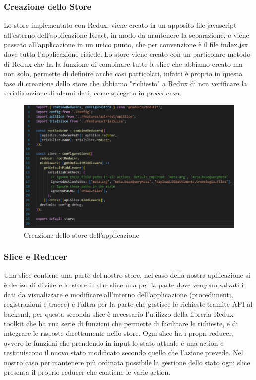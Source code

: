 \subsubsection{Creazione dello Store}
Lo store implementato con Redux, viene creato in un apposito file javascript all'esterno dell'applicazione React, in modo da mantenere la separazione, e viene passato all'applicazione
in un unico punto, che per convenzione è il file index.jsx dove tutta l'applicazione risiede. Lo store viene creato con un particolare metodo di Redux che ha la funzione di combinare
tutte le slice che abbiamo creato ma non solo, permette di definire anche casi particolari, infatti è proprio in questa fase di creazione dello store che abbiamo "richiesto" a Redux di non
verificare la serializzazione di alcuni dati, come spiegato in precedenza.

\begin{figure}[H]
  \centering
  \includegraphics[width=\textwidth]{immagini/creazione-store.png}
  \caption{Creazione dello store dell'applicazione}
\end{figure}

\subsubsection{Slice e Reducer}
Una slice contiene una parte del nostro store, nel caso della nostra apllicazione si è deciso di dividere lo store in due slice una per la parte dove vengono salvati i dati da
visualizzare e modificare all'interno dell'applicazione (procedimenti, registrazioni e tracce) e l'altra per la parte che gestisce le richieste tramite API al backend, per questa
seconda slice è necessario l'utilizzo della libreria Redux-toolkit che ha una serie di funzioni che permette di facilitare le richieste, e di integrare le risposte direttamente nello store.
Ogni slice ha i propri reducer, ovvero le funzioni che prendendo in input lo stato attuale e una action e restituiscono il nuovo stato modificato secondo quello che l'azione prevede.
Nel nostro caso per mantenere più ordinata possibile la gestione dello stato ogni slice presenta il proprio reducer che contiene le varie action.

